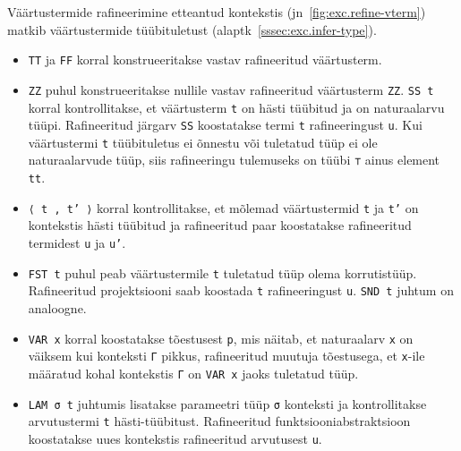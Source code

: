 \documentclass[a4paper,12pt]{article}
\begin{document}
Väärtustermide rafineerimine etteantud kontekstis (jn~\ref{fig:exc.refine-vterm}) matkib väärtustermide tüübituletust (alaptk~\ref{sssec:exc.infer-type}).
\begin{itemize}
\item {\tt TT} ja {\tt FF} korral konstrueeritakse vastav rafineeritud väärtusterm.
\item {\tt ZZ} puhul konstrueeritakse nullile vastav rafineeritud väärtusterm {\tt ZZ}. {\tt SS t} korral kontrollitakse, et väärtusterm {\tt t} on hästi tüübitud ja on naturaalarvu tüüpi. Rafineeritud järgarv {\tt SS} koostatakse termi {\tt t} rafineeringust {\tt u}. Kui väärtustermi {\tt t} tüübituletus ei õnnestu või tuletatud tüüp ei ole naturaalarvude tüüp, siis rafineeringu tulemuseks on tüübi {\tt ⊤} ainus element {\tt tt}.
\item {\tt ⟨ t , t' ⟩} korral kontrollitakse, et mõlemad väärtustermid {\tt t} ja {\tt t'} on kontekstis hästi tüübitud ja rafineeritud paar koostatakse rafineeritud termidest {\tt u} ja {\tt u'}.
\item {\tt FST t} puhul peab väärtustermile {\tt t} tuletatud tüüp olema korrutistüüp. Rafineeritud projektsiooni saab koostada {\tt t} rafineeringust {\tt u}. {\tt SND t} juhtum on analoogne.
\item {\tt VAR x} korral koostatakse tõestusest {\tt p}, mis näitab, et naturaalarv {\tt x} on väiksem kui konteksti {\tt Γ} pikkus, rafineeritud muutuja tõestusega, et {\tt x}-ile määratud kohal kontekstis {\tt Γ} on {\tt VAR x} jaoks tuletatud tüüp.
\item {\tt LAM σ t} juhtumis lisatakse parameetri tüüp {\tt σ} konteksti ja kontrollitakse arvutustermi {\tt t} hästi-tüübitust. Rafineeritud funktsiooniabstraktsioon koostatakse uues kontekstis rafineeritud arvutusest {\tt u}.
\end{itemize}
\end{document}
